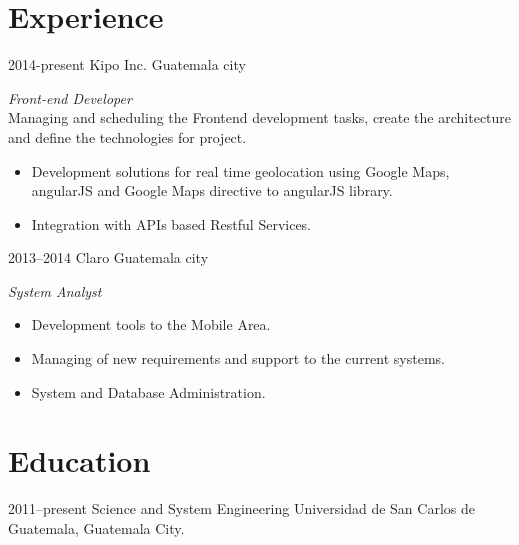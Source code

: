 \documentclass[]{friggeri-cv} %
\begin{document}
\section{Experience}
\begin{entrylist}
\entry
	{2014-present}
	{Kipo Inc.}
	{Guatemala city}
	{\emph{Front-end Developer} \\
	Managing and scheduling the Frontend development tasks, create the architecture and define the technologies for project.
	\begin{itemize}
		\item Development solutions for real time geolocation using Google Maps, angularJS and Google Maps directive to angularJS library.
		\item Integration with APIs based Restful Services.
	\end{itemize}
	
	}
	
\entry
	{2013--2014}
	{Claro}
	{Guatemala city}
	{\emph{System Analyst} \\
	
	\begin{itemize}
		\item Development tools to the Mobile Area.
		\item Managing of new requirements and support to the current systems.
		\item System and Database Administration.
	\end{itemize}
	
	}



\end{entrylist}


\section{Education}

\begin{entrylist}
\entry
{2011--present}
{Science and System Engineering}
{Universidad de San Carlos de Guatemala, Guatemala City.}
{}
\end{entrylist}
\end{document}
